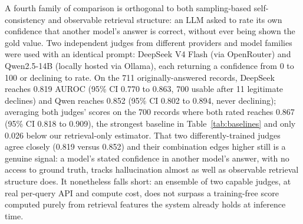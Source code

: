 \documentclass[sn-basic]{sn-jnl}
\theoremstyle{thmstyleone}
\theoremstyle{thmstyletwo}
\begin{document}
A fourth family of comparison is orthogonal to both sampling-based
self-consistency and observable retrieval structure: an LLM asked to rate
its own confidence that another model's answer is correct, without ever
being shown the gold value. Two independent judges from different providers
and model families were used with an identical prompt: DeepSeek V4 Flash
(via OpenRouter) and Qwen2.5-14B (locally hosted via Ollama), each
returning a confidence from 0 to 100 or declining to rate. On the 711
originally-answered records, DeepSeek reaches 0.819 AUROC (95\% CI 0.770 to
0.863, 700 usable after 11 legitimate declines) and Qwen reaches 0.852
(95\% CI 0.802 to 0.894, never declining); averaging both judges' scores on
the 700 records where both rated reaches 0.867 (95\% CI 0.818 to 0.909),
the strongest baseline in Table~\ref{tab:baselines} and only 0.026 below
our retrieval-only estimator. That two differently-trained judges agree
closely (0.819 versus 0.852) and their combination edges higher still is a
genuine signal: a model's stated confidence in another model's answer, with
no access to ground truth, tracks hallucination almost as well as
observable retrieval structure does. It nonetheless falls short: an
ensemble of two capable judges, at real per-query API and compute cost,
does not surpass a training-free score computed purely from retrieval
features the system already holds at inference time.
\end{document}
